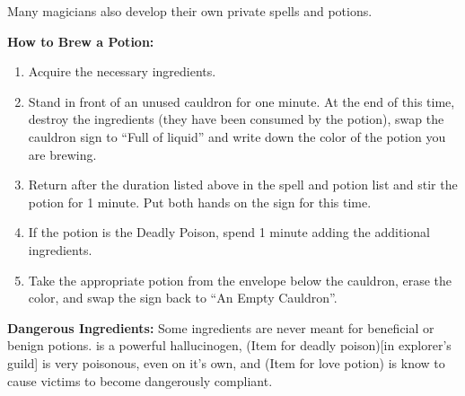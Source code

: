 \documentclass[green]{NeptuneBall}
\begin{document}
Many magicians also develop their own private spells and potions.

{\bf How to Brew a Potion:}\\ %
\begin{enumerate}
  \item Acquire the necessary ingredients.
  \item Stand in front of an unused cauldron for one minute. At the end of this time, destroy the ingredients (they have been consumed by the potion), swap the cauldron sign to ``Full of liquid'' and write down the color of the potion you are brewing.
  \item Return after the duration listed above in the spell and potion list and stir the potion for 1 minute. Put both hands on the sign for this time.
  \item If the potion is the Deadly Poison, spend 1 minute adding the additional ingredients.
  \item Take the appropriate potion from the envelope below the cauldron, erase the color, and swap the sign back to ``An Empty Cauldron''.
\end{enumerate}

{\bf Dangerous Ingredients:}
Some ingredients are never meant for beneficial or benign potions. \iHemlock{} is a powerful hallucinogen, (Item for deadly poison)[in explorer's guild] is very poisonous, even on it's own, and (Item for love potion) is know to cause victims to become dangerously compliant.
\end{document}
